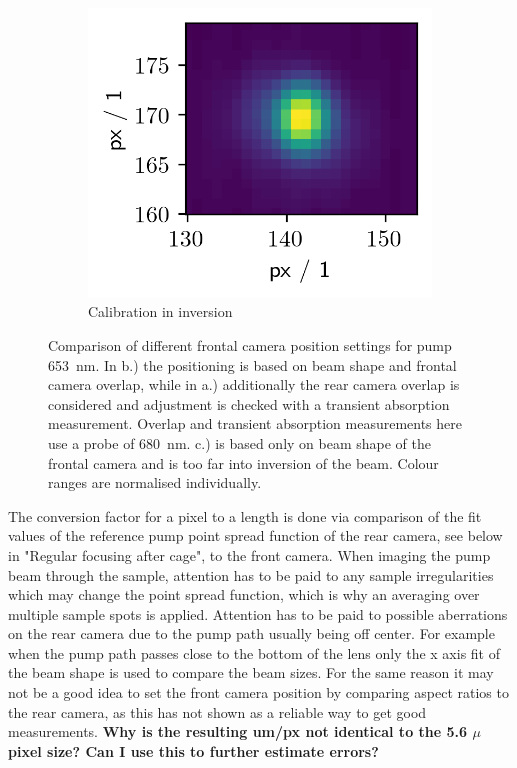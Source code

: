\documentclass[twoside,openright]{scrreprt}
\begin{document}
\begin{figure}[hbtp]
\begin{subfigure}[b]{0.32\linewidth}
\includegraphics[scale=1]{images/CalibComparison/worstComparisonCalib.png}
\caption{Calibration in inversion}
\end{subfigure}
\caption{Comparison of different frontal camera position settings for pump \qty{653}{\nano\meter}. In b.) the positioning is based on beam shape and frontal camera overlap, while in a.) additionally the rear camera overlap is considered and adjustment is checked with a transient absorption measurement. Overlap and transient absorption measurements here use a probe of \qty{680}{\nano\meter}. c.) is based only on beam shape of the frontal camera and is too far into inversion of the beam. Colour ranges are normalised individually.\label{fig:pumpCalibComparison}}
\end{figure}

The conversion factor for a pixel to a length is done via comparison of the fit values of the reference pump point spread function of the rear camera, see below in "Regular focusing after cage", to the front camera. When imaging the pump beam through the sample, attention has to be paid to any sample irregularities which may change the point spread function, which is why an averaging over multiple sample spots is applied. Attention has to be paid to possible aberrations on the rear camera due to the pump path usually being off center. For example when the pump path passes close to the bottom of the lens only the x axis fit of the beam shape is used to compare the beam sizes. For the same reason it may not be a good idea to set the front camera position by comparing aspect ratios to the rear camera, as this has not shown as a reliable way to get good measurements.
\textbf{Why is the resulting um/px not identical to the 5.6 $\mu$ pixel size? Can I use this to further estimate errors?}
\end{document}
